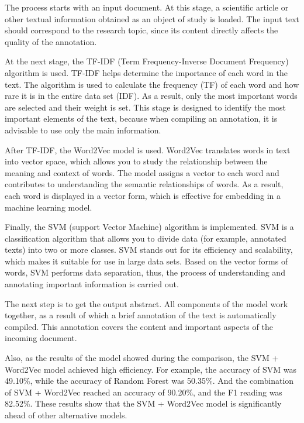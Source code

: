 \begin{multicols}{2}
The process starts with an input document. At this stage, a scientific
article or other textual information obtained as an object of study is
loaded. The input text should correspond to the research topic, since
its content directly affects the quality of the annotation.

At the next stage, the TF-IDF (Term Frequency-Inverse Document
Frequency) algorithm is used. TF-IDF helps determine the importance of
each word in the text. The algorithm is used to calculate the frequency
(TF) of each word and how rare it is in the entire data set (IDF). As a
result, only the most important words are selected and their weight is
set. This stage is designed to identify the most important elements of
the text, because when compiling an annotation, it is advisable to use
only the main information.

After TF-IDF, the Word2Vec model is used. Word2Vec translates words in
text into vector space, which allows you to study the relationship
between the meaning and context of words. The model assigns a vector to
each word and contributes to understanding the semantic relationships of
words. As a result, each word is displayed in a vector form, which is
effective for embedding in a machine learning model.

Finally, the SVM (support Vector Machine) algorithm is implemented. SVM
is a classification algorithm that allows you to divide data (for
example, annotated texts) into two or more classes. SVM stands out for
its efficiency and scalability, which makes it suitable for use in large
data sets. Based on the vector forms of words, SVM performs data
separation, thus, the process of understanding and annotating important
information is carried out.

The next step is to get the output abstract. All components of the model
work together, as a result of which a brief annotation of the text is
automatically compiled. This annotation covers the content and important
aspects of the incoming document.

Also, as the results of the model showed during the comparison, the SVM
+ Word2Vec model achieved high efficiency. For example, the accuracy of
SVM was 49.10\%, while the accuracy of Random Forest was 50.35\%. And
the combination of SVM + Word2Vec reached an accuracy of 90.20\%, and
the F1 reading was 82.52\%. These results show that the SVM + Word2Vec
model is significantly ahead of other alternative models.


\end{multicols}
